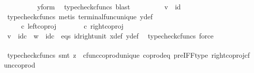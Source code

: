 \begin{isabellebody}
\ \ \ \ \ \ \ \ \isamarkupfalse%
\ y{\isacharunderscore}{\kern0pt}form\ \isamarkupfalse%
\ {\isacharparenleft}{\kern0pt}typecheck{\isacharunderscore}{\kern0pt}cfuncs{\isacharcomma}{\kern0pt}\ blast{\isacharparenright}{\kern0pt}\isanewline
\ \ \ \ \ \ \isamarkupfalse%
\ \isamarkupfalse%
\ {\isachardoublequoteopen}v\ {\isacharequal}{\kern0pt}\ id\ {\isasymone}{\isachardoublequoteclose}\isanewline
\ \ \ \ \ \ \ \ \isamarkupfalse%
\ {\isacharparenleft}{\kern0pt}typecheck{\isacharunderscore}{\kern0pt}cfuncs{\isacharcomma}{\kern0pt}\ metis\ terminal{\isacharunderscore}{\kern0pt}func{\isacharunderscore}{\kern0pt}unique\ y{\isacharunderscore}{\kern0pt}def{\isacharparenright}{\kern0pt}\isanewline
\ \ \ \ \ \ \isamarkupfalse%
\ \isamarkupfalse%
\ {\isachardoublequoteopen}{\isasymlangle}{\isasymt}{\isacharcomma}{\kern0pt}\ {\isasymt}{\isasymrangle}\ {\isasymamalg}{\isasymlangle}{\isasymf}{\isacharcomma}{\kern0pt}\ {\isasymf}{\isasymrangle}\ {\isasymcirc}\isactrlsub c\ left{\isacharunderscore}{\kern0pt}coproj\ {\isasymone}\ {\isasymone}\ {\isacharequal}{\kern0pt}\ {\isasymlangle}{\isasymt}{\isacharcomma}{\kern0pt}\ {\isasymt}{\isasymrangle}\ {\isasymamalg}{\isasymlangle}{\isasymf}{\isacharcomma}{\kern0pt}\ {\isasymf}{\isasymrangle}\ {\isasymcirc}\isactrlsub c\ right{\isacharunderscore}{\kern0pt}coproj\ {\isasymone}\ {\isasymone}{\isachardoublequoteclose}\isanewline
\ \ \ \ \ \ \ \ \isamarkupfalse%
\ {\isacartoucheopen}v\ {\isacharequal}{\kern0pt}\ id\isactrlsub c\ {\isasymone}{\isacartoucheclose}\ {\isacartoucheopen}w\ {\isacharequal}{\kern0pt}\ id\isactrlsub c\ {\isasymone}{\isacartoucheclose}\ eqs\ id{\isacharunderscore}{\kern0pt}right{\isacharunderscore}{\kern0pt}unit{}\ x{\isacharunderscore}{\kern0pt}def\ y{\isacharunderscore}{\kern0pt}def\ \isamarkupfalse%
\ {\isacharparenleft}{\kern0pt}typecheck{\isacharunderscore}{\kern0pt}cfuncs{\isacharcomma}{\kern0pt}\ force{\isacharparenright}{\kern0pt}\isanewline
\ \ \ \ \ \ \isamarkupfalse%
\ \isamarkupfalse%
\ {\isachardoublequoteopen}{\isasymlangle}{\isasymt}{\isacharcomma}{\kern0pt}\ {\isasymt}{\isasymrangle}\ {\isacharequal}{\kern0pt}\ {\isasymlangle}{\isasymf}{\isacharcomma}{\kern0pt}{\isasymf}{\isasymrangle}{\isachardoublequoteclose}\isanewline
\ \ \ \ \ \ \ \ \isamarkupfalse%
\ {\isacharparenleft}{\kern0pt}typecheck{\isacharunderscore}{\kern0pt}cfuncs{\isacharcomma}{\kern0pt}\ smt\ {\isacharparenleft}{\kern0pt}z{}{\isacharparenright}{\kern0pt}\ \ cfunc{\isacharunderscore}{\kern0pt}coprod{\isacharunderscore}{\kern0pt}unique\ coprod{\isacharunderscore}{\kern0pt}eq{}\ pre{\isacharunderscore}{\kern0pt}IFF{\isacharunderscore}{\kern0pt}type\ right{\isacharunderscore}{\kern0pt}coproj{\isacharunderscore}{\kern0pt}cfunc{\isacharunderscore}{\kern0pt}coprod{\isacharparenright}{\kern0pt}\ \ \ \ \ \ \isanewline

\end{isabellebody}

